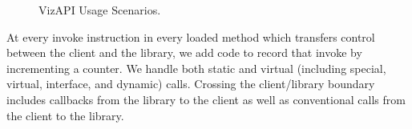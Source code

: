 \begin{figure}[ht]
\begin{center}

\hspace{7mm}


\caption{\label{fig:usagescenarios} VizAPI Usage Scenarios.}

\end{center}
\end{figure}

At every invoke instruction in every
loaded method which transfers control between the client and the
library, we add code to record that invoke by incrementing a counter.
We handle both static and virtual (including special, virtual,
interface, and dynamic) calls. Crossing the client/library boundary
includes callbacks from the library to the client as well as conventional
calls from the client to the library. 

